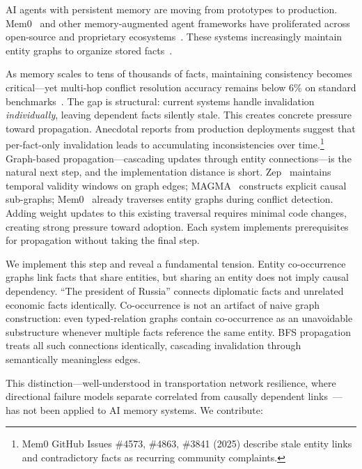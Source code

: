 \documentclass{article}
\begin{document}
AI agents with persistent memory are moving from prototypes to production.
Mem0~\citep{mem0_2024} and other memory-augmented agent frameworks have proliferated across open-source and proprietary ecosystems~\citep{graph_agent_memory_survey_2026}.
These systems increasingly maintain entity graphs to organize stored facts~\citep{mem0_2024, magma_2026, zep_2025}.

As memory scales to tens of thousands of facts, maintaining consistency becomes critical---yet multi-hop conflict resolution accuracy remains below 6\% on standard benchmarks~\citep{memoryagentbench_2026}.
The gap is structural: current systems handle invalidation \textit{individually}, leaving dependent facts silently stale.
This creates concrete pressure toward propagation.
Anecdotal reports from production deployments suggest that per-fact-only invalidation leads to accumulating inconsistencies over time.\footnote{Mem0 GitHub Issues \#4573, \#4863, \#3841 (2025) describe stale entity links and contradictory facts as recurring community complaints.}
Graph-based propagation---cascading updates through entity connections---is the natural next step, and the implementation distance is short.
Zep~\citep{zep_2025} maintains temporal validity windows on graph edges; MAGMA~\citep{magma_2026} constructs explicit causal sub-graphs; Mem0~\citep{mem0_2024} already traverses entity graphs during conflict detection.
Adding weight updates to this existing traversal requires minimal code changes, creating strong pressure toward adoption.
Each system implements prerequisites for propagation without taking the final step.

We implement this step and reveal a fundamental tension.
Entity co-occurrence graphs link facts that share entities, but sharing an entity does not imply causal dependency.
``The president of Russia'' connects diplomatic facts and unrelated economic facts identically.
Co-occurrence is not an artifact of naive graph construction: even typed-relation graphs contain co-occurrence as an unavoidable substructure whenever multiple facts reference the same entity.
BFS propagation treats all such connections identically, cascading invalidation through semantically meaningless edges.

This distinction---well-understood in transportation network resilience, where directional failure models separate correlated from causally dependent links~\citep{chen_network_2007}---has not been applied to AI memory systems.
We contribute:
\end{document}
